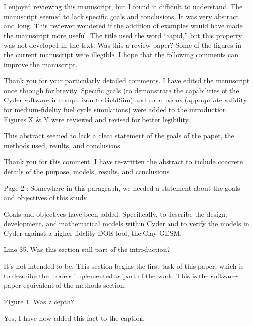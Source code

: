 \documentclass[answers,12pt]{exam}
\begin{document}
\begin{questions}
\question I enjoyed reviewing this manuscript, but I found it difficult to understand.
The manuscript seemed to lack specific goals and conclusions. It was very
abstract and long.  This reviewer wondered if the addition of examples would
have made the manuscript more useful. The title used the word ``rapid,'' but this
property was not developed in the text. Was this a review paper? Some of the
figures in the current manuscript were illegible. I hope that the following
comments can improve the manuscript.
\begin{solution}
Thank you for your particularly detailed comments. I have edited the manuscript
        once through for brevity. Specific 
        goals (to demonstrate the capabilities of the Cyder software in 
        comparison to GoldSim) and conclusions (appropriate validity for 
        medium-fidelity fuel cycle simulations) were added to the introduction. 
        Figures X \& Y were reviewed and revised for better legibility.
\end{solution}

\question This abstract seemed to lack a clear statement of the goals of the paper, the methods used, results, and conclusions.
\begin{solution}
Thank you for this comment. I have re-written the abstract to include concrete 
details of the purpose, models, results, and conclusions. 
\end{solution}

\question Page 2 : Somewhere in this paragraph, we needed a statement about the goals and objectives of this study.
\begin{solution}
Goals and objectives have been added. Specifically, to describe the design, 
        development, and mathematical models within Cyder and to verify the 
        models in Cyder against a higher fidelity DOE tool, the Clay GDSM.
\end{solution}


\question Line 35. Was this section still part of the introduction?

\begin{solution}
It's not intended to be. This section begins the first task of this paper, which is to describe the 
models implemented as part of the work. This is the software-paper equivalent 
        of the methods section.
\end{solution}

\question Figure 1. Was z depth?
\begin{solution}
Yes, I have now added this fact to the caption.
\end{solution}


\end{questions}
\end{document}
